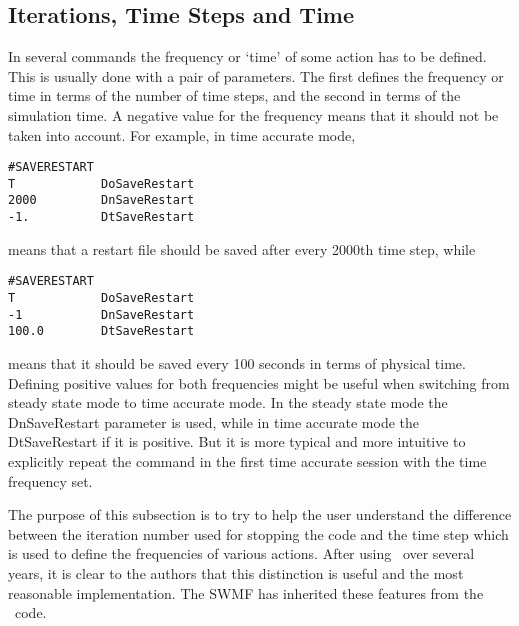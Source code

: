 \subsection{Iterations, Time Steps and Time \label{section:frequency}}

In several commands the frequency or `time' of some action has
to be defined. This is usually done with a pair of parameters.
The first defines the frequency or time in terms of the number of time steps,
and the second in terms of the simulation time.
A negative value for the frequency means that it should not be taken 
into account. For example, in time accurate mode,
\begin{verbatim}
#SAVERESTART
T            DoSaveRestart
2000         DnSaveRestart
-1.          DtSaveRestart
\end{verbatim}
means that a restart file should be saved after every 2000th time step, while
\begin{verbatim}
#SAVERESTART
T            DoSaveRestart
-1           DnSaveRestart
100.0        DtSaveRestart
\end{verbatim}
means that it should be saved every 100 seconds in terms of physical time.
Defining positive values for both frequencies might be useful
when switching from steady state mode to time accurate mode.
In the steady state mode the DnSaveRestart parameter is used,
while in time accurate mode the DtSaveRestart if it is positive.
But it is more typical and more intuitive 
to explicitly repeat the command in the first 
time accurate session with the time frequency set.

The purpose of this subsection is to try to help the user understand 
the difference between the iteration number used for stopping the code
and the time step which is used to define the frequencies of various
actions. After using \BATSRUS\ over several years, it is clear to the
authors that this distinction is useful and the
most reasonable implementation. The SWMF has inherited these
features from the \BATSRUS\ code.

